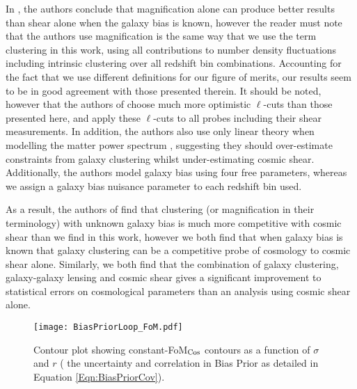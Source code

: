 \documentclass[useAMS,usenatbib,times,letter,amssymb]{mn2e}
\begin{document}
In \cite{Gaztanaga:2012p1194}, the authors conclude that magnification alone can produce better results than shear alone when the galaxy bias is known, however the reader must note that the authors use magnification is the same way that we use the term clustering in this work, using all contributions to number density fluctuations including intrinsic clustering over all redshift bin combinations. Accounting for the fact that we use different definitions for our figure of merits, our results seem to be in good agreement with those presented therein. It should be noted, however that the authors of \cite{Gaztanaga:2012p1194} choose much more optimistic $\ell$-cuts than those presented here, and apply these $\ell$-cuts to all probes including their shear measurements. In addition, the authors also use only linear theory when modelling the matter power spectrum , suggesting they should over-estimate constraints from galaxy clustering whilst under-estimating cosmic shear. Additionally, the authors model galaxy bias using four free parameters, whereas we assign a galaxy bias nuisance parameter to each redshift bin used.

As a result, the authors of \cite{Gaztanaga:2012p1194} find that clustering (or magnification in their terminology) with unknown galaxy bias is much more competitive with cosmic shear than we find in this work, however we both find that when galaxy bias is known that galaxy clustering can be a competitive probe of cosmology to cosmic shear alone.  Similarly, we both find that the combination of galaxy clustering, galaxy-galaxy lensing and cosmic shear gives a significant improvement to statistical errors on cosmological parameters than an analysis using cosmic shear alone.



\begin{figure}
\centering
\texttt{[image: BiasPriorLoop\_FoM.pdf]}
\caption{Contour plot showing constant-FoM$_{\rm Cos}$ contours as a function of $\sigma$ and $r$ ( the uncertainty and correlation in Bias Prior as detailed in Equation \ref{Eqn:BiasPriorCov}). }\label{Fig:BiasPrior_ContourPlot}
\end{figure}
\end{document}
